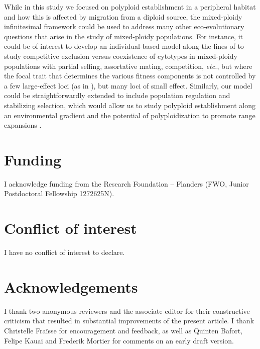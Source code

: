 \documentclass[12pt,a4paper]{article}
\begin{document}
While in this study we focused on polyploid establishment in a peripheral
habitat and how this is affected by migration from a diploid source, the
mixed-ploidy infinitesimal framework could be used to address many other
eco-evolutionary questions that arise in the study of mixed-ploidy populations.
For instance, it could be of interest to develop an individual-based
model along the lines of \cite{oswald2011} to study competitive exclusion
versus coexistence of cytotypes in mixed-ploidy populations with partial
selfing, assortative mating, competition, \textit{etc.}, but where the focal
trait that determines the various fitness components is not controlled by a few
large-effect loci (as in \cite{oswald2011}), but many loci of small effect.
Similarly, our model could be straightforwardly extended to include population
regulation and stabilizing selection, which would allow us to study polyploid
establishment along an environmental gradient and the potential of
polyploidization to promote range expansions \citep{polechova2015}.

\section*{Funding}

I acknowledge funding from the Research Foundation -- Flanders (FWO, Junior
Postdoctoral Fellowship 1272625N).

\section*{Conflict of interest}

I have no conflict of interest to declare.

\section*{Acknowledgements}

I thank two anonymous reviewers and the associate editor for their constructive
criticism that resulted in substantial improvements of the present article.
I thank Christelle Fraïsse for encouragement and feedback, as well as Quinten
Bafort, Felipe Kauai and Frederik Mortier for comments on an early draft
version.



\end{document}
